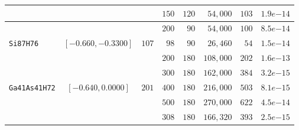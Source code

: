 \begin{tabular}{l|c|c|c|c|c|c|c}
 & & & $150$ & $120$ & $\phantom{0}54,000$ & $103$ & $1.9e{-14}$ \\\hline
 & & & $200$ & $\phantom{0}90$ & $\phantom{0}54,000$ & $100$ & $8.5e{-14}$ \\
\verb|Si87H76| & $[-0.660,-0.3300]$ & $107$ & $\phantom{0}98$ & $\phantom{0}90$ & $\phantom{0}26,460$ & $\phantom{0}54$ & $1.5e{-14}$ \\
 & & & $200$ & $180$ & $108,000$ & $202$ & $1.6e{-13}$ \\\hline
 & & & $300$ & $180$ & $162,000$ & $384$ & $3.2e{-15}$ \\
\verb|Ga41As41H72| & $[-0.640,0.0000]$ & $201$ & $400$ & $180$ & $216,000$ & $503$ & $8.1e{-15}$ \\
 & & & $500$ & $180$ & $270,000$ & $622$ & $4.5e{-14}$ \\\hline
 & & & $308$ & $180$ & $166,320$ & $393$ & $2.5e{-15}$ \\
\end{tabular}